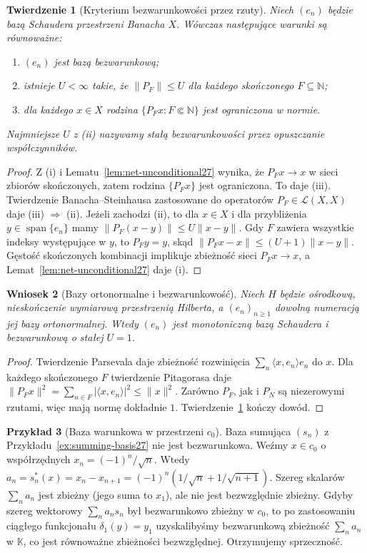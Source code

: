 \documentclass[11pt,a4paper]{article}
\numberwithin{equation}{section}
\theoremstyle{plain}
\newtheorem{twierdzenie}{Twierdzenie}[section]
\newtheorem{wniosek}[twierdzenie]{Wniosek}
\theoremstyle{definition}
\newtheorem{przyklad}[twierdzenie]{Przykład}
\theoremstyle{remark}
\newcommand{\N}{\mathbb N}
\newcommand{\K}{\mathbb K}
\begin{document}
\begin{twierdzenie}[Kryterium bezwarunkowości przez rzuty]
\label{thm:unconditional-projections27}
Niech $(e_n)$ będzie bazą Schaudera przestrzeni Banacha $X$.
Wówczas następujące warunki są równoważne:
\begin{enumerate}[label=\textup{(\roman*)}]
\item $(e_n)$ jest bazą bezwarunkową;
\item istnieje $U<\infty$ takie, że $\|P_F\|\le U$
 dla każdego skończonego $F\subseteq\N$;
\item dla każdego $x\in X$ rodzina
$\{P_Fx:F\Subset\N\}$ jest ograniczona w normie.
\end{enumerate}
Najmniejsze $U$ z (ii) nazywamy \emph{stałą bezwarunkowości
przez opuszczanie współczynników}.
\end{twierdzenie}
\begin{proof}
Z (i) i Lematu~\ref{lem:net-unconditional27} wynika, że
$P_Fx\to x$ w sieci zbiorów skończonych, zatem rodzina
$\{P_Fx\}$ jest ograniczona. To daje (iii).
Twierdzenie Banacha--Steinhausa zastosowane do operatorów
$P_F\in\mathcal L(X,X)$ daje (iii) $\Rightarrow$ (ii).
Jeżeli zachodzi (ii), to dla $x\in X$ i dla przybliżenia
$y\in\operatorname{span}\{e_n\}$ mamy
$\|P_F(x-y)\|\le U\|x-y\|$.
Gdy $F$ zawiera wszystkie indeksy występujące w $y$,
to $P_Fy=y$, skąd $\|P_Fx-x\|\le(U+1)\|x-y\|$.
Gęstość skończonych kombinacji implikuje zbieżność
sieci $P_Fx\to x$, a Lemat~\ref{lem:net-unconditional27}
daje (i).
\end{proof}

\begin{wniosek}[Bazy ortonormalne i bezwarunkowość]
\label{cor:hilbert-unconditional27}
Niech $H$ będzie ośrodkową, nieskończenie wymiarową
przestrzenią Hilberta, a $(e_n)_{n\ge1}$ dowolną numeracją
jej bazy ortonormalnej. Wtedy $(e_n)$ jest monotoniczną
bazą Schaudera i bezwarunkową o stałej $U=1$.
\end{wniosek}
\begin{proof}
Twierdzenie Parsevala daje zbieżność rozwinięcia
$\sum_n\langle x,e_n\rangle e_n$ do $x$.
Dla każdego skończonego $F$ twierdzenie Pitagorasa
daje $\|P_Fx\|^2=\sum_{n\in F}|\langle x,e_n\rangle|^2
\le\|x\|^2$. Zarówno $P_F$, jak i $P_N$ są
niezerowymi rzutami, więc mają normę dokładnie $1$.
Twierdzenie~\ref{thm:unconditional-projections27} kończy dowód.
\end{proof}

\begin{przyklad}[Baza warunkowa w przestrzeni $c_0$]
\label{ex:conditional-summing27}
Baza sumująca $(s_n)$ z Przykładu~\ref{ex:summing-basis27}
nie jest bezwarunkowa. Weźmy $x\in c_0$ o współrzędnych
$x_n=(-1)^n/\sqrt n$. Wtedy
$a_n=s_n^*(x)=x_n-x_{n+1}=(-1)^n(1/\sqrt n+1/\sqrt{n+1})$.
Szereg skalarów $\sum_n a_n$ jest zbieżny (jego suma to
$x_1$), ale nie jest bezwzględnie zbieżny.
Gdyby szereg wektorowy $\sum_n a_ns_n$ był bezwarunkowo
zbieżny w $c_0$, to po zastosowaniu ciągłego
funkcjonału $\delta_1(y)=y_1$ uzyskalibyśmy bezwarunkową
zbieżność $\sum_n a_n$ w $\K$, co jest równoważne
zbieżności bezwzględnej. Otrzymujemy sprzeczność.
\end{przyklad}
\end{document}
